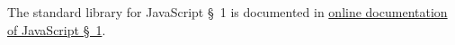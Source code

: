 









\newpage



















The standard library for JavaScript \S\ 1 is documented in
\href{}{online documentation of JavaScript \S\ 1}.




    
